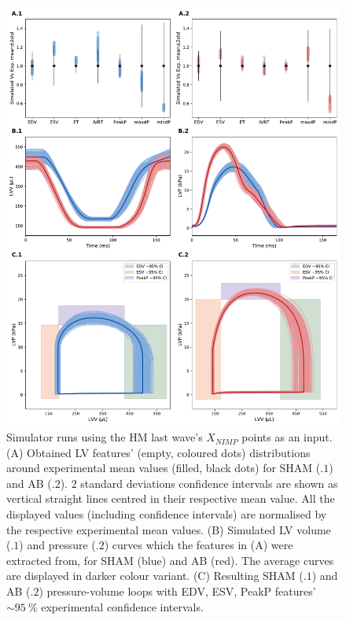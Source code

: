 \begin{figure}[ht!]
    \myfloatalign
    \includegraphics[width=\textwidth]{figures/chapter04/sham_vs_ab_fit.pdf}
    \caption{Simulator runs using the HM last wave’s $X_{NIMP}$ points as an input. (A) Obtained LV features’ (empty, coloured dots) distributions around experimental mean values (filled, black dots) for SHAM (.$1$) and AB (.$2$). $2$ standard deviations confidence intervals are shown as vertical straight lines centred in their respective mean value. All the displayed values (including confidence intervals) are normalised by the respective experimental mean values. (B) Simulated LV volume (.$1$) and pressure (.$2$) curves which the features in (A) were extracted from, for SHAM (blue) and AB (red). The average curves are displayed in darker colour variant. (C) Resulting SHAM (.$1$) and AB (.$2$) pressure-volume loops with EDV, ESV, PeakP features’ $\sim\SI{95}{\percent}$ experimental confidence intervals.}
    \label{fig:simulatormatchtoexpvar}
\end{figure}

